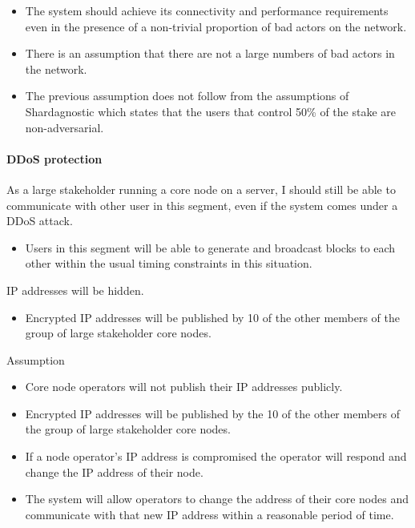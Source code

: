 \begin{itemize}
\item The system should achieve its connectivity and performance requirements
      even in the presence of a non-trivial proportion of bad actors on the
      network.
\item There is an assumption that there are not a large numbers of bad actors
      in the network.
\item The previous assumption does not follow from the assumptions of Shardagnostic
      which states that the users that control 50\% of the stake are
      non-adversarial.
\end{itemize}


\paragraph{DDoS protection}

As a large stakeholder running a core node on a server, I should still be able
to communicate with other user in this segment, even if the system comes under
a DDoS attack.

\begin{itemize}
\item Users in this segment will be able to generate and broadcast blocks to
      each other within the usual timing constraints in this situation.
\end{itemize}

IP addresses will be hidden.

\begin{itemize}
\item Encrypted IP addresses will be published by 10 of the other members of
      the group of large stakeholder core nodes.
\end{itemize}

Assumption

\begin{itemize}
\item Core node operators will not publish their IP addresses publicly.
\item Encrypted IP addresses will be published by the 10 of the other members
      of the group of large stakeholder core nodes.
\item If a node operator's IP address is compromised the operator will respond
      and change the IP address of their node.
\item The system will allow operators to change the address of their core nodes
      and communicate with that new IP address within a reasonable period of
      time.
\end{itemize}


